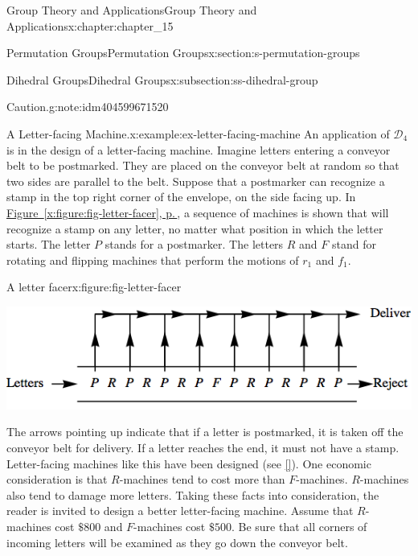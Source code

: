 \documentclass[twoside,10pt,]{book}
\newcommand{\xreffont}{\relax}
\numberwithin{equation}{section}
\begin{document}
\begin{chapterptx}{Group Theory and Applications}{}{Group Theory and Applications}{}{}{x:chapter:chapter_15}
\begin{sectionptx}{Permutation Groups}{}{Permutation Groups}{}{}{x:section:s-permutation-groups}
\begin{subsectionptx}{Dihedral Groups}{}{Dihedral Groups}{}{}{x:subsection:ss-dihedral-group}
\begin{note}{Caution.}{g:note:idm404599671520}
\end{note}
\begin{example}{A Letter-facing Machine.}{x:example:ex-letter-facing-machine}%
An application of \(\mathcal{D}_4\) is in the design of a letter-facing machine.  Imagine letters entering a conveyor belt to be postmarked. They are placed on the conveyor belt at random so that two sides are parallel to the belt. Suppose that a postmarker can recognize a stamp in the top right corner of the envelope, on the side facing up. In \hyperref[x:figure:fig-letter-facer]{Figure~{\xreffont\ref{x:figure:fig-letter-facer}}, p.\,\pageref{x:figure:fig-letter-facer}}, a sequence of machines is shown that will recognize a stamp on any letter, no matter what position in which the letter starts. The letter \(P\) stands for a postmarker. The letters \(R\) and \(F\) stand for rotating and flipping machines that perform the motions of \(r_1\) and \(f_1\).%
\begin{figureptx}{A letter facer}{x:figure:fig-letter-facer}{}%
\begin{image}{0.1}{0.8}{0.1}%
\includegraphics[width=\linewidth]{images/fig-letter-facer.png}
\end{image}%
\tcblower
\end{figureptx}%
The arrows pointing up indicate that if a letter is postmarked, it is taken off the conveyor belt for delivery. If a letter reaches the end, it must not have a stamp. Letter-facing machines like this have been designed (see \hyperlink{x:biblio:biblio-gallian-1977}{[{\xreffont 16}]}). One economic consideration is that \(R\)-machines tend to cost more than \(F\)-machines. \(R\)-machines also tend to damage more letters. Taking these facts into consideration, the reader is invited to design a better letter-facing machine. Assume that \(R\)-machines cost \(\$800\) and \(F\)-machines cost \(\$500\). Be sure that all corners of incoming letters will be examined as they go down the conveyor belt.%
\end{example}
\end{subsectionptx}
%
%
\typeout{************************************************}
\typeout{************************************************}

\end{sectionptx}
\end{chapterptx}
\end{document}
